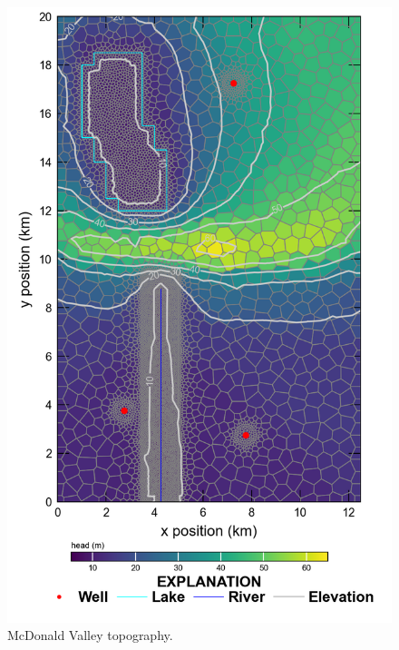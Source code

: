 \documentclass[11pt, oneside]{article}   	%
\begin{document}
\begin{figure}[ht!]
	\begin{center}
		\includegraphics{figures/mv_voronoi_top.png}
	\end{center}
	\caption{McDonald Valley topography.}
	\label{fig:mvtop}
\end{figure}
\end{document}
